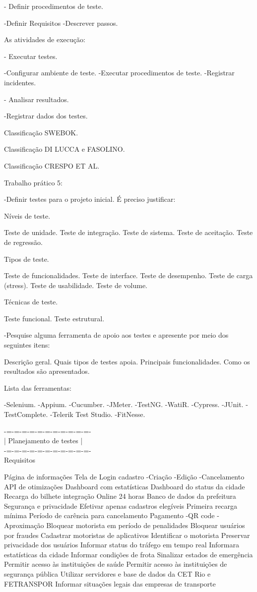 \documentclass{article}
\begin{document}
			- Definir procedimentos de teste.

				-Definir Requisitos
				-Descrever passos.

		As atividades de execução:

			- Executar testes.

				-Configurar ambiente de teste.
				-Executar procedimentos de teste.
				-Registrar incidentes.

			- Analisar resultados.

				-Registrar dados dos testes.

Classificação SWEBOK.

Classificação DI LUCCA e FASOLINO.

Classificação CRESPO ET AL.

Trabalho prático 5:

	-Definir testes para o projeto inicial. É preciso justificar:
		
		Níveis de teste.

			Teste de unidade.
			Teste de integração.
			Teste de sistema.
			Teste de aceitação.
			Teste de regressão.

		Tipos de teste.

			Teste de funcionalidades.
			Teste de interface.
			Teste de desempenho.
			Teste de carga (stress).
			Teste de usabilidade.
			Teste de volume.

		Técnicas de teste.
		
			Teste funcional.
			Teste estrutural.

	-Pesquise alguma ferramenta de apoio aos testes e apresente por meio dos seguintes itens:
		
		Descrição geral.
		Quais tipos de testes apoia.
		Principais funcionalidades.
		Como os resultados são apresentados.
		
		Lista das ferramentas:
		
			-Selenium.
			-Appium.
			-Cucumber.
			-JMeter.
			-TestNG.
			-WatiR.
			-Cypress.
			-JUnit.
			-TestComplete.
			-Telerik Test Studio.
			-FitNesse.
			
-=-=-=-=-=-=-=-=-=-=-=-\\
| Planejamento de testes    |\\
-=-=-=-=-=-=-=-=-=-=-=-\\
Requisitos

	Página de informações
	Tela de Login
	cadastro
		-Criação
		-Edição
		-Cancelamento
	API de otimizações
	Dashboard com estatísticas
	Dashboard do status da cidade
	Recarga do bilhete integração
	Online 24 horas
	Banco de dados da prefeitura
	Segurança e privacidade
	Efetivar apenas cadastros elegíveis
	Primeira recarga mínima
	Período de carência para cancelamento
	Pagamento
		-QR code
		-Aproximação
	Bloquear motorista em período de penalidades
	Bloquear usuários por fraudes
	Cadastrar motoristas de aplicativos
	Identificar o motorista
	Preservar privacidade dos usuários
	Informar status do tráfego em tempo real
	Informara estatísticas da cidade
	Informar condições de frota
	Sinalizar estados de emergência
	Permitir acesso às instituições de saúde
	Permitir acesso às instituições de segurança pública
	Utilizar servidores e base de dados da CET Rio e
FETRANSPOR
	Informar situações legais das empresas de transporte
\end{document}
